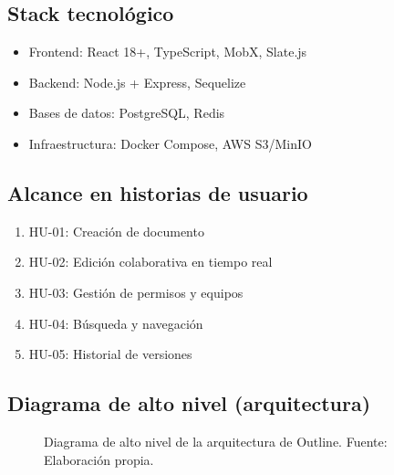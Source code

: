 \documentclass[12pt]{article}
\begin{document}
\subsection{Stack tecnológico}
\begin{itemize}
    \item Frontend: React 18+, TypeScript, MobX, Slate.js
    \item Backend: Node.js + Express, Sequelize
    \item Bases de datos: PostgreSQL, Redis
    \item Infraestructura: Docker Compose, AWS S3/MinIO
\end{itemize}

\subsection{Alcance en historias de usuario}
\begin{enumerate}
    \item HU-01: Creación de documento
    \item HU-02: Edición colaborativa en tiempo real
    \item HU-03: Gestión de permisos y equipos
    \item HU-04: Búsqueda y navegación
    \item HU-05: Historial de versiones
\end{enumerate}

\subsection{Diagrama de alto nivel (arquitectura)}
\begin{figure}[H]
\centering
{}
\caption{Diagrama de alto nivel de la arquitectura de Outline. Fuente: Elaboración propia.}
\label{fig:diagrama}
\end{figure}
\end{document}
